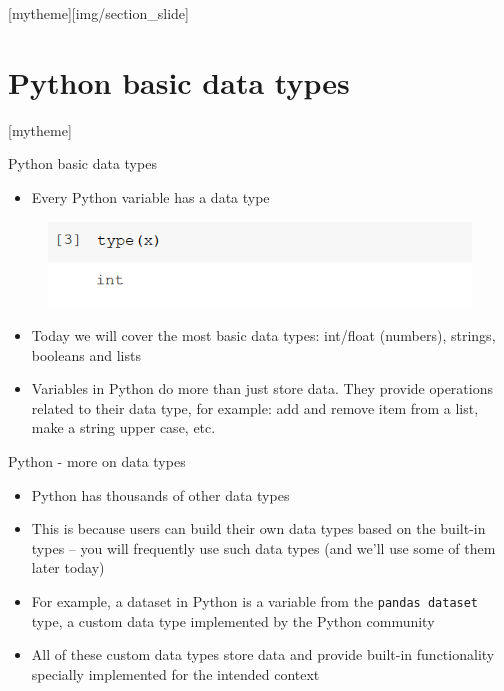 \documentclass[aspectratio=169]{beamer}
\newcommand{\sectionpic}[2]{
	\setbeamertemplate{section page}[mytheme][#2]
	\section{#1}
	\setbeamertemplate{section page}[mytheme]
}
\begin{document}
\sectionpic{Python basic data types}{img/section_slide}

\begin{frame}{Python basic data types}

	\begin{itemize}
		\item Every Python variable has a data type
	\end{itemize}

	\begin{figure}
		\centering
		\includegraphics[width=0.6\linewidth]{img/data_type.png}
	\end{figure}

	\begin{itemize}
		\item Today we will cover the most basic data types: 
		int/float (numbers), strings, booleans and lists
		\item Variables in Python do more than just store data.
		They provide operations related to their data type, 
		for example: add and remove item from a list, make a string upper case, etc.
	\end{itemize}

\end{frame}

\begin{frame}{Python - more on data types}

	\begin{itemize}
		\item Python has thousands of other data types
		\item This is because users can build their own data types based on the built-in types 
		-- you will frequently use such data types \scriptsize(and we'll use some of them later today) \normalsize
		\item For example, a dataset in Python is a variable from the \texttt{pandas dataset} type, a custom data type implemented by the Python community
		\item All of these custom data types store data 
		and provide built-in functionality specially implemented for the intended context
	\end{itemize}
\end{frame}
\end{document}
